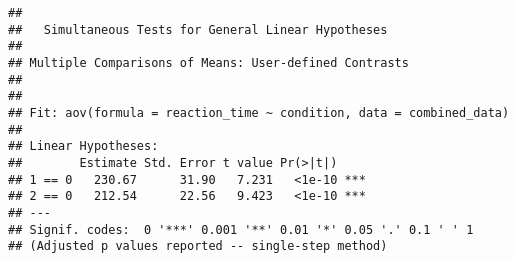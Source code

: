 \documentclass[
]{article}
\begin{document}
\begin{verbatim}
## 
##   Simultaneous Tests for General Linear Hypotheses
## 
## Multiple Comparisons of Means: User-defined Contrasts
## 
## 
## Fit: aov(formula = reaction_time ~ condition, data = combined_data)
## 
## Linear Hypotheses:
##        Estimate Std. Error t value Pr(>|t|)    
## 1 == 0   230.67      31.90   7.231   <1e-10 ***
## 2 == 0   212.54      22.56   9.423   <1e-10 ***
## ---
## Signif. codes:  0 '***' 0.001 '**' 0.01 '*' 0.05 '.' 0.1 ' ' 1
## (Adjusted p values reported -- single-step method)
\end{verbatim}
\end{document}
